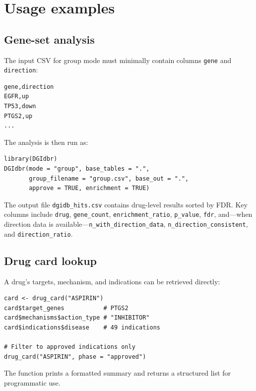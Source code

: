 \documentclass[11pt,a4paper]{article}
\begin{document}
\section{Usage examples}
\label{sec:examples}

\subsection{Gene-set analysis}

The input CSV for group mode must minimally contain columns \texttt{gene} and \texttt{direction}:

\begin{lstlisting}
gene,direction
EGFR,up
TP53,down
PTGS2,up
...
\end{lstlisting}

The analysis is then run as:

\begin{lstlisting}
library(DGIdbr)
DGIdbr(mode = "group", base_tables = ".",
       group_filename = "group.csv", base_out = ".",
       approve = TRUE, enrichment = TRUE)
\end{lstlisting}

The output file \texttt{dgidb\_hits.csv} contains drug-level results sorted by FDR. Key columns include \texttt{drug}, \texttt{gene\_count}, \texttt{enrichment\_ratio}, \texttt{p\_value}, \texttt{fdr}, and---when direction data is available---\texttt{n\_with\_direction\_data}, \texttt{n\_direction\_consistent}, and \texttt{direction\_ratio}.

\subsection{Drug card lookup}

A drug's targets, mechanism, and indications can be retrieved directly:

\begin{lstlisting}
card <- drug_card("ASPIRIN")
card$target_genes           # PTGS2
card$mechanisms$action_type # "INHIBITOR"
card$indications$disease    # 49 indications

# Filter to approved indications only
drug_card("ASPIRIN", phase = "approved")
\end{lstlisting}

The function prints a formatted summary and returns a structured list for programmatic use.
\end{document}
